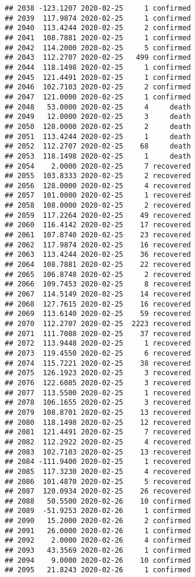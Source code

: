 \documentclass[
]{article}
\begin{document}
\begin{verbatim}
## 2038 -123.1207 2020-02-25     1 confirmed
## 2039  117.9874 2020-02-25     1 confirmed
## 2040  113.4244 2020-02-25     2 confirmed
## 2041  108.7881 2020-02-25     1 confirmed
## 2042  114.2000 2020-02-25     5 confirmed
## 2043  112.2707 2020-02-25   499 confirmed
## 2044  118.1498 2020-02-25     1 confirmed
## 2045  121.4491 2020-02-25     1 confirmed
## 2046  102.7103 2020-02-25     2 confirmed
## 2047  121.0000 2020-02-25     1 confirmed
## 2048   53.0000 2020-02-25     4     death
## 2049   12.0000 2020-02-25     3     death
## 2050  128.0000 2020-02-25     2     death
## 2051  113.4244 2020-02-25     1     death
## 2052  112.2707 2020-02-25    68     death
## 2053  118.1498 2020-02-25     1     death
## 2054    2.0000 2020-02-25     7 recovered
## 2055  103.8333 2020-02-25     2 recovered
## 2056  128.0000 2020-02-25     4 recovered
## 2057  101.0000 2020-02-25     1 recovered
## 2058  108.0000 2020-02-25     2 recovered
## 2059  117.2264 2020-02-25    49 recovered
## 2060  116.4142 2020-02-25    17 recovered
## 2061  107.8740 2020-02-25    23 recovered
## 2062  117.9874 2020-02-25    16 recovered
## 2063  113.4244 2020-02-25    36 recovered
## 2064  108.7881 2020-02-25    22 recovered
## 2065  106.8748 2020-02-25     2 recovered
## 2066  109.7453 2020-02-25     8 recovered
## 2067  114.5149 2020-02-25    14 recovered
## 2068  127.7615 2020-02-25    16 recovered
## 2069  113.6140 2020-02-25    59 recovered
## 2070  112.2707 2020-02-25  2223 recovered
## 2071  111.7088 2020-02-25    37 recovered
## 2072  113.9448 2020-02-25     1 recovered
## 2073  119.4550 2020-02-25     6 recovered
## 2074  115.7221 2020-02-25    38 recovered
## 2075  126.1923 2020-02-25     3 recovered
## 2076  122.6085 2020-02-25     3 recovered
## 2077  113.5500 2020-02-25     1 recovered
## 2078  106.1655 2020-02-25     3 recovered
## 2079  108.8701 2020-02-25    13 recovered
## 2080  118.1498 2020-02-25    12 recovered
## 2081  121.4491 2020-02-25     7 recovered
## 2082  112.2922 2020-02-25     4 recovered
## 2083  102.7103 2020-02-25    13 recovered
## 2084 -111.9400 2020-02-25     1 recovered
## 2085  117.3230 2020-02-25     4 recovered
## 2086  101.4870 2020-02-25     5 recovered
## 2087  120.0934 2020-02-25    26 recovered
## 2088   50.5500 2020-02-26    10 confirmed
## 2089  -51.9253 2020-02-26     1 confirmed
## 2090   15.2000 2020-02-26     2 confirmed
## 2091   26.0000 2020-02-26     1 confirmed
## 2092    2.0000 2020-02-26     4 confirmed
## 2093   43.3569 2020-02-26     1 confirmed
## 2094    9.0000 2020-02-26    10 confirmed
## 2095   21.8243 2020-02-26     1 confirmed

\end{verbatim}
\end{document}

